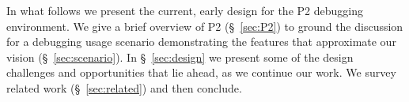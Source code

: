 \documentclass[10pt,twocolumn]{article}
\def\Sys{P2\xspace}
\begin{document}
In what follows we present the current, early design for the \Sys
debugging environment.  We give a brief overview of \Sys
(\S~\ref{sec:P2}) to ground the discussion for a debugging usage
scenario demonstrating the features that approximate our vision
(\S~\ref{sec:scenario}). In \S~\ref{sec:design} we present some of the
design challenges and opportunities that lie ahead, as we continue our
work.  We survey related work (\S~\ref{sec:related}) and then
conclude.



% 
% 
\end{document}
